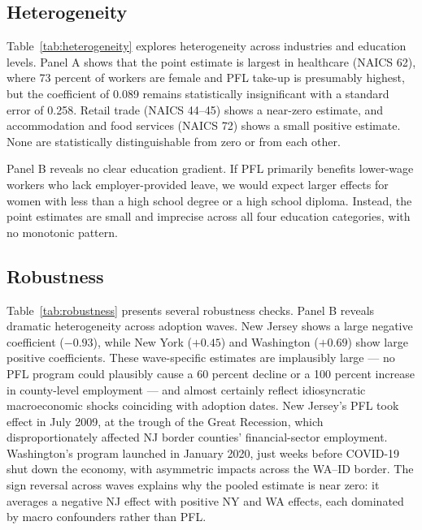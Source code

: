 \documentclass[12pt]{article}
\begin{document}
\subsection{Heterogeneity}



Table~\ref{tab:heterogeneity} explores heterogeneity across industries and education levels. Panel A shows that the point estimate is largest in healthcare (NAICS 62), where 73 percent of workers are female and PFL take-up is presumably highest, but the coefficient of 0.089 remains statistically insignificant with a standard error of 0.258. Retail trade (NAICS 44--45) shows a near-zero estimate, and accommodation and food services (NAICS 72) shows a small positive estimate. None are statistically distinguishable from zero or from each other.

Panel B reveals no clear education gradient. If PFL primarily benefits lower-wage workers who lack employer-provided leave, we would expect larger effects for women with less than a high school degree or a high school diploma. Instead, the point estimates are small and imprecise across all four education categories, with no monotonic pattern.


\subsection{Robustness}



Table~\ref{tab:robustness} presents several robustness checks. Panel B reveals dramatic heterogeneity across adoption waves. New Jersey shows a large negative coefficient ($-0.93$), while New York ($+0.45$) and Washington ($+0.69$) show large positive coefficients. These wave-specific estimates are implausibly large --- no PFL program could plausibly cause a 60 percent decline or a 100 percent increase in county-level employment --- and almost certainly reflect idiosyncratic macroeconomic shocks coinciding with adoption dates. New Jersey's PFL took effect in July 2009, at the trough of the Great Recession, which disproportionately affected NJ border counties' financial-sector employment. Washington's program launched in January 2020, just weeks before COVID-19 shut down the economy, with asymmetric impacts across the WA--ID border. The sign reversal across waves explains why the pooled estimate is near zero: it averages a negative NJ effect with positive NY and WA effects, each dominated by macro confounders rather than PFL.
\end{document}
